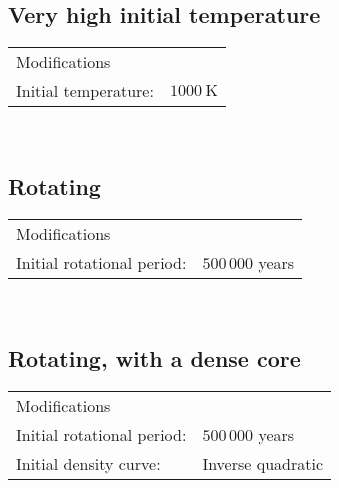 \documentclass[../main.tex]{subfiles}
\begin{document}
\subsection{Very high initial temperature}

\begin{tabular}{ll}
\multicolumn{2}{l}{Modifications} \\
\qquad Initial temperature:                    & $\SI{1000}{\kelvin}$ \\
\end{tabular}
\\

\subsection{Rotating}

\begin{tabular}{ll}
\multicolumn{2}{l}{Modifications} \\
    \qquad Initial rotational period:          & $500 \, 000$ years \\
\end{tabular}
\\

\subsection{Rotating, with a dense core}

\begin{tabular}{ll}
\multicolumn{2}{l}{Modifications} \\
    \qquad Initial rotational period:          & $500 \, 000$ years \\
    \qquad Initial density curve:              & Inverse quadratic \\
\end{tabular}
\\
\end{document}
